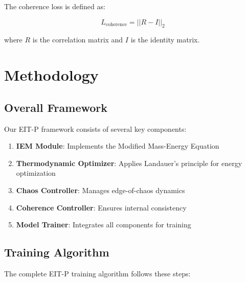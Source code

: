 \documentclass[12pt]{article}
\begin{document}
The coherence loss is defined as:

\begin{equation}
L_{\text{coherence}} = ||R - I||_2
\end{equation}

where $R$ is the correlation matrix and $I$ is the identity matrix.

\section{Methodology}

\subsection{Overall Framework}

Our EIT-P framework consists of several key components:

\begin{enumerate}
\item \textbf{IEM Module}: Implements the Modified Mass-Energy Equation
\item \textbf{Thermodynamic Optimizer}: Applies Landauer's principle for energy optimization
\item \textbf{Chaos Controller}: Manages edge-of-chaos dynamics
\item \textbf{Coherence Controller}: Ensures internal consistency
\item \textbf{Model Trainer}: Integrates all components for training
\end{enumerate}

\subsection{Training Algorithm}

The complete EIT-P training algorithm follows these steps:
\end{document}
